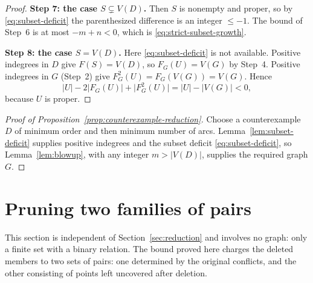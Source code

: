 \documentclass[11pt]{article}
\theoremstyle{remark}
\newcommand{\abs}[1]{\lvert #1\rvert}
\newcommand{\Step}[1]{\par\medskip\noindent\textbf{#1}\enspace}
\begin{document}
\begin{proof}
\Step{Step 7: the case $S\subsetneq V(D)$.}
Then $S$ is nonempty and proper, so by \eqref{eq:subset-deficit} the
parenthesized difference is an integer $\le-1$. The bound of Step~6 is at
most $-m+n<0$, which is \eqref{eq:strict-subset-growth}.

\Step{Step 8: the case $S=V(D)$.}
Here \eqref{eq:subset-deficit} is not available. Positive indegrees in $D$
give $F(S)=V(D)$, so $F_G(U)=V(G)$ by Step~4. Positive indegrees in $G$
(Step~2) give $F_G^2(U)=F_G(V(G))=V(G)$. Hence
\[
  \abs{U}-2\abs{F_G(U)}+\abs{F_G^2(U)}
  =\abs{U}-\abs{V(G)}<0,
\]
because $U$ is proper.
\end{proof}

\begin{proof}[Proof of Proposition~\ref{prop:counterexample-reduction}]
Choose a counterexample $D$ of minimum order and then minimum number of
arcs. Lemma~\ref{lem:subset-deficit} supplies positive indegrees and
the subset deficit \eqref{eq:subset-deficit}, so Lemma~\ref{lem:blowup},
with any integer $m>\abs{V(D)}$, supplies the required graph $G$.
\end{proof}

\section{Pruning two families of pairs}\label{sec:pruning}

This section is independent of Section~\ref{sec:reduction} and involves no
graph: only a finite set with a binary relation. The bound proved here
charges the deleted members to two sets of pairs: one determined by the
original conflicts, and the other consisting of points left uncovered after
deletion.
\end{document}

